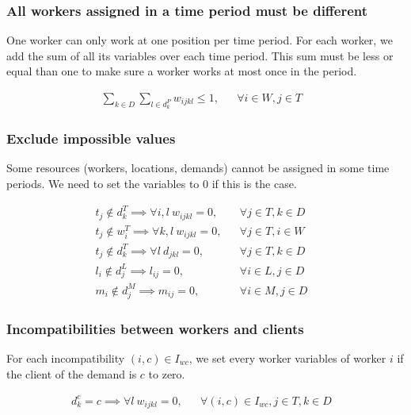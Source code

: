 \documentclass[../../thesis.tex]{subfiles}
\begin{document}
\subsubsection{All workers assigned in a time period must be different}

One worker can only work at one position per time period. For each worker, we add the sum of all its variables 
over each time period. This sum must be less or equal than one to make sure a worker works at most once in the period.

\begin{align}
  \sum_{k \in D} \sum_{l \in d_k^P} w_{ijkl} \leq 1, && \forall i \in W, j \in T & \label{wc2} 
\end{align}


\subsubsection{Exclude impossible values}

Some resources (workers, locations, demands) cannot be assigned in some time periods. We need to set the variables to 0 if this is the case.

\begin{align}
  t_j \notin d^T_{k} \implies \forall i, l \ w_{ijkl} = 0,  && \forall j \in T , k \in D &\label{wc3} \\
  t_j \notin w^T_{i} \implies \forall k, l \ w_{ijkl} = 0, && \forall j \in T, i \in W &\label{wc4} \\
  t_j \notin d^T_{k} \implies \forall l \ d_{jkl} = 0,  && \forall j \in T , k \in D &\label{sc1} \\ 
  l_i \notin d^L_j \implies l_{ij} = 0, && \forall i \in L, j \in D& \label{lc1} \\ 
  m_i \notin d^M_j \implies m_{ij} = 0, && \forall i \in M, j \in D& \label{mc1} 
\end{align}


\subsubsection{Incompatibilities between workers and clients}

For each incompatibility $(i, c) \in I_{wc}$, we set every worker variables of worker $i$ if the client of the 
demand is $c$ to zero.

\begin{align}
  d^c_{k} = c \implies \forall l \ w_{ijkl} = 0, && \forall {(i, c) \in I_{wc}}, j \in T, k \in D &\label{wc6}
\end{align}
\end{document}
